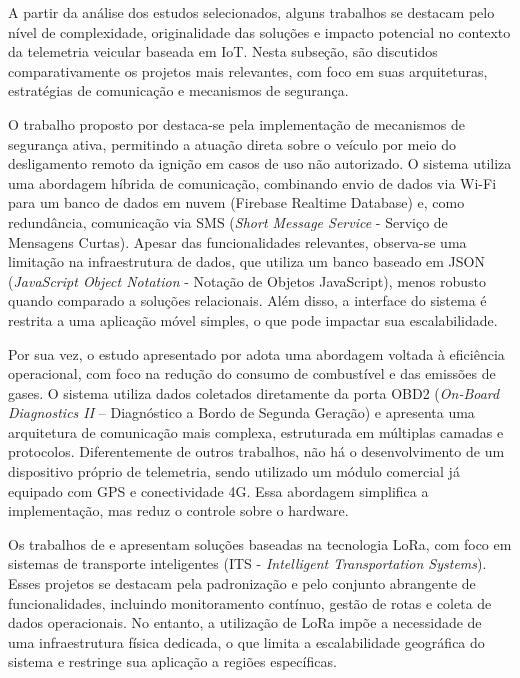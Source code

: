 \documentclass[
	article,			%
	11pt,				%
	oneside,			%
	a4paper,			%
	english,			%
	brazil,				%
	sumario=tradicional
	]{abntex2}
\begin{document}
A partir da análise dos estudos selecionados, alguns trabalhos se destacam pelo nível de complexidade, originalidade das soluções e impacto potencial no contexto da telemetria veicular baseada em IoT. Nesta subseção, são discutidos comparativamente os projetos mais relevantes, com foco em suas arquiteturas, estratégias de comunicação e mecanismos de segurança.

O trabalho proposto por \cite{sridharan2025smart} destaca-se pela implementação de mecanismos de segurança ativa, permitindo a atuação direta sobre o veículo por meio do desligamento remoto da ignição em casos de uso não autorizado. O sistema utiliza uma abordagem híbrida de comunicação, combinando envio de dados via Wi-Fi para um banco de dados em nuvem (Firebase Realtime Database) e, como redundância, comunicação via SMS (\textit{Short Message Service} - Serviço de Mensagens Curtas). Apesar das funcionalidades relevantes, observa-se uma limitação na infraestrutura de dados, que utiliza um banco baseado em JSON (\textit{JavaScript Object Notation} - Notação de Objetos JavaScript), menos robusto quando comparado a soluções relacionais. Além disso, a interface do sistema é restrita a uma aplicação móvel simples, o que pode impactar sua escalabilidade.

Por sua vez, o estudo apresentado por \cite{zahid2025advanced} adota uma abordagem voltada à eficiência operacional, com foco na redução do consumo de combustível e das emissões de gases. O sistema utiliza dados coletados diretamente da porta OBD2 (\textit{On-Board Diagnostics II} – Diagnóstico a Bordo de Segunda Geração) e apresenta uma arquitetura de comunicação mais complexa, estruturada em múltiplas camadas e protocolos. Diferentemente de outros trabalhos, não há o desenvolvimento de um dispositivo próprio de telemetria, sendo utilizado um módulo comercial já equipado com GPS e conectividade 4G. Essa abordagem simplifica a implementação, mas reduz o controle sobre o hardware.

Os trabalhos de \cite{rojas2020fleet} e \cite{bolanos2022fleet} apresentam soluções baseadas na tecnologia LoRa, com foco em sistemas de transporte inteligentes (ITS - \textit{Intelligent Transportation Systems}). Esses projetos se destacam pela padronização e pelo conjunto abrangente de funcionalidades, incluindo monitoramento contínuo, gestão de rotas e coleta de dados operacionais. No entanto, a utilização de LoRa impõe a necessidade de uma infraestrutura física dedicada, o que limita a escalabilidade geográfica do sistema e restringe sua aplicação a regiões específicas.
\end{document}
